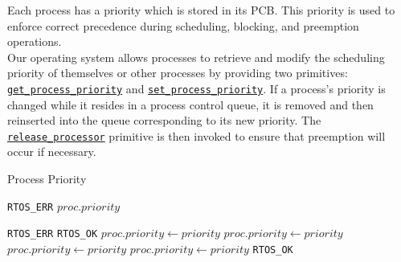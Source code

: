 \documentclass[12pt]{report}
\begin{document}
Each process has a priority which is stored in its PCB. This priority is used to enforce correct precedence during scheduling, blocking, and preemption operations.\\

Our operating system allows processes to retrieve and modify the scheduling priority of themselves or other processes by providing two primitives: \hyperref[alg:processpriority]{\texttt{get_process_priority}} and \hyperref[alg:processpriority]{\texttt{set_process_priority}}. If a process's priority is changed while it resides in a process control queue, it is removed and then reinserted into the queue corresponding to its new priority. The \hyperref[alg:releasingtheprocessor]{\texttt{release_processor}} primitive is then invoked to ensure that preemption will occur if necessary.

\begin{algorithm}
\caption{Process Priority}
\label{alg:processpriority}
\begin{algorithmic}[1]
        \State \Return \texttt{RTOS_ERR}
    \EndIf
    \State \Return $proc.priority$
\EndProcedure

\Statex

        \State \Return \texttt{RTOS_ERR}
    \EndIf
        \State \Return \texttt{RTOS_OK} 
    \EndIf
        \State {}
        \State $proc.priority \leftarrow priority$
        \State {}
        \State {}
        \State $proc.priority \leftarrow priority$
        \State {}
        \State {}
        \State $proc.priority \leftarrow priority$
        \State {}
    \Else
        \State $proc.priority \leftarrow priority$
    \EndIf
    \State {}
    \State \Return \texttt{RTOS_OK}
\EndProcedure
\end{algorithmic}
\end{algorithm}
\end{document}
